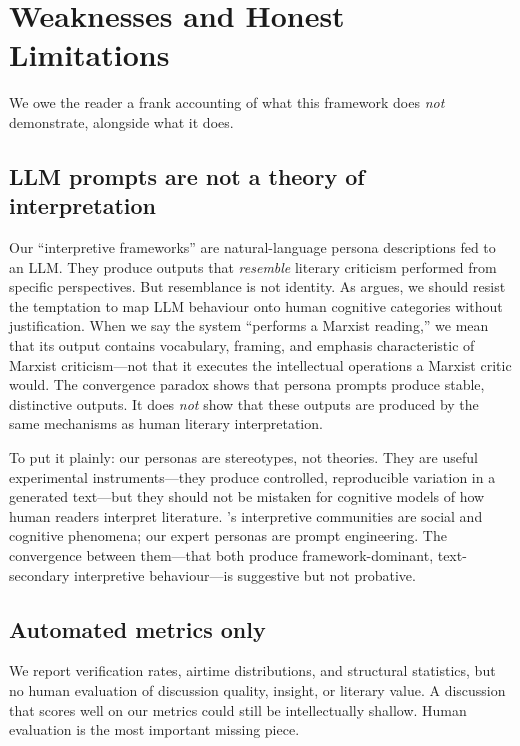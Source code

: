 \documentclass{article}
\begin{document}
\section{Weaknesses and Honest Limitations}
\label{sec:weaknesses}

We owe the reader a frank accounting of what this framework does
\emph{not} demonstrate, alongside what it does.

\subsection{LLM prompts are not a theory of interpretation}

Our ``interpretive frameworks'' are natural-language persona
descriptions fed to an LLM.  They produce outputs that
\emph{resemble} literary criticism performed from specific
perspectives.  But resemblance is not identity.  As
\textcite{shanahan2024talking} argues, we should resist the temptation
to map LLM behaviour onto human cognitive categories without
justification.  When we say the system ``performs a Marxist reading,''
we mean that its output contains vocabulary, framing, and emphasis
characteristic of Marxist criticism---not that it executes the
intellectual operations a Marxist critic would.  The convergence
paradox shows that persona prompts produce stable, distinctive
outputs.  It does \emph{not} show that these outputs are produced by
the same mechanisms as human literary interpretation.

To put it plainly: our personas are stereotypes, not theories.  They
are useful experimental instruments---they produce controlled,
reproducible variation in a generated text---but they should not be
mistaken for cognitive models of how human readers interpret
literature.  \textcite{fish1980text}'s interpretive communities are
social and cognitive phenomena; our expert personas are prompt
engineering.  The convergence between them---that both produce
framework-dominant, text-secondary interpretive behaviour---is
suggestive but not probative.

\subsection{Automated metrics only}

We report verification rates, airtime distributions, and structural
statistics, but no human evaluation of discussion quality, insight, or
literary value.  A discussion that scores well on our metrics could
still be intellectually shallow.  Human evaluation is the most
important missing piece.
\end{document}
